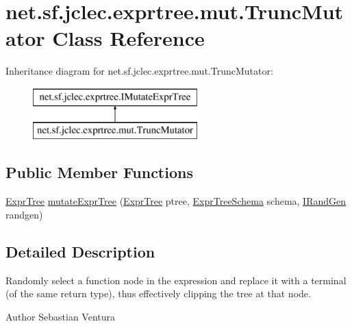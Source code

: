\hypertarget{classnet_1_1sf_1_1jclec_1_1exprtree_1_1mut_1_1_trunc_mutator}{\section{net.\-sf.\-jclec.\-exprtree.\-mut.\-Trunc\-Mutator Class Reference}
\label{classnet_1_1sf_1_1jclec_1_1exprtree_1_1mut_1_1_trunc_mutator}
}
Inheritance diagram for net.\-sf.\-jclec.\-exprtree.\-mut.\-Trunc\-Mutator\-:\begin{figure}[H]
\begin{center}
\leavevmode
\includegraphics[height=2.000000cm]{classnet_1_1sf_1_1jclec_1_1exprtree_1_1mut_1_1_trunc_mutator}
\end{center}
\end{figure}
\subsection*{Public Member Functions}
\begin{DoxyCompactItemize}
\item 
\hyperlink{classnet_1_1sf_1_1jclec_1_1exprtree_1_1_expr_tree}{Expr\-Tree} \hyperlink{classnet_1_1sf_1_1jclec_1_1exprtree_1_1mut_1_1_trunc_mutator_a7d9f2e3ded6be297461ebab2624dcce6}{mutate\-Expr\-Tree} (\hyperlink{classnet_1_1sf_1_1jclec_1_1exprtree_1_1_expr_tree}{Expr\-Tree} ptree, \hyperlink{classnet_1_1sf_1_1jclec_1_1exprtree_1_1_expr_tree_schema}{Expr\-Tree\-Schema} schema, \hyperlink{interfacenet_1_1sf_1_1jclec_1_1util_1_1random_1_1_i_rand_gen}{I\-Rand\-Gen} randgen)
\end{DoxyCompactItemize}


\subsection{Detailed Description}
Randomly select a function node in the expression and replace it with a terminal (of the same return type), thus effectively clipping the tree at that node.

\begin{DoxyAuthor}{Author}
Sebastian Ventura 
\end{DoxyAuthor}



